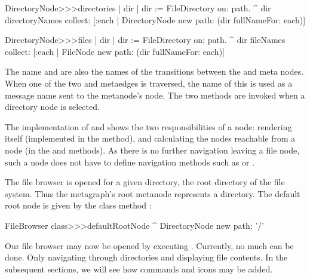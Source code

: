 \documentclass[a4paper,10pt,twoside]{book}
\begin{document}
\begin{code}{}    
DirectoryNode>>>directories
     | dir | 
     dir := FileDirectory on: path.
     ^ dir directoryNames collect: [:each | 
                            DirectoryNode new path: (dir fullNameFor: each)]

DirectoryNode>>>files
    | dir | 
     dir := FileDirectory on:  path.
     ^ dir fileNames collect: [:each | 
                            FileNode new path: (dir fullNameFor: each)]
\end{code}

The name  and  are also the names of the transitions between the  and  meta nodes. When one of the two  and  metaedges is traversed, the name of this  is used as a message name sent to the metanode's node. The two methods are invoked when a directory node is selected.

The implementation of  and  shows the two responsibilities of a node: rendering itself (implemented in the  method), and calculating the nodes reachable from a node (in the  and  methods). As there is no further navigation leaving a file node, such a node does not have to define navigation methods such as  or .


The file browser is opened for a given directory, \eg the root directory of the file system. Thus the metagraph's root metanode represents a directory. The default root node is given by the class method :

\begin{code}{}    
FileBrowser class>>>defaultRootNode
     ^ DirectoryNode new path: '/'
\end{code}

Our file browser may now be opened by executing . Currently, no much can be done. Only navigating through directories and displaying file contents. In the subsequent sections, we will see how commands and icons may be added.

\end{document}
